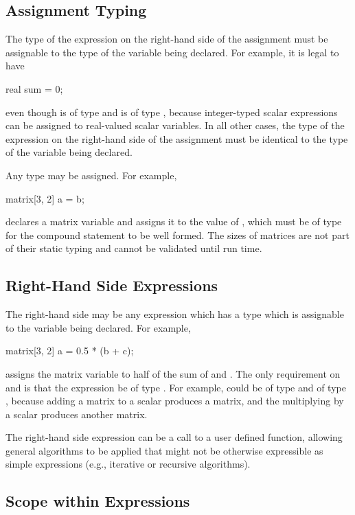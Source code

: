\subsection{Assignment Typing}

The type of the expression on the right-hand side of the assignment
must be assignable to the type of the variable being declared.  For
example, it is legal to have
%
\begin{stancode}
real sum = 0;
\end{stancode}
%
even though  is of type  and  is of type
, because integer-typed scalar expressions can be assigned
to real-valued scalar variables.  In all other cases, the type of the
expression on the right-hand side of the assignment must be identical
to the type of the variable being declared.

Any type may be assigned.  For example,
%
\begin{stancode}
matrix[3, 2] a = b;
\end{stancode}
%
declares a matrix variable  and assigns it to the value of
, which must be of type  for the compound
statement to be well formed.  The sizes of matrices are not part of
their static typing and cannot be validated until run time.


\subsection{Right-Hand Side Expressions}

The right-hand side may be any expression which has a type which is
assignable to the variable being declared.  For example,
%
\begin{stancode}
matrix[3, 2] a = 0.5 * (b + c);
\end{stancode}
%
assigns the matrix variable  to half of the sum of 
and .  The only requirement on  and  is that
the expression  be of type .  For example,
 could be of type  and  of type
, because adding a matrix to a scalar produces a matrix,
and the multiplying by a scalar produces another matrix.

The right-hand side expression can be a call to a user defined
function, allowing general algorithms to be applied that might not be
otherwise expressible as simple expressions (e.g., iterative or
recursive algorithms).


\subsection{Scope within Expressions}

